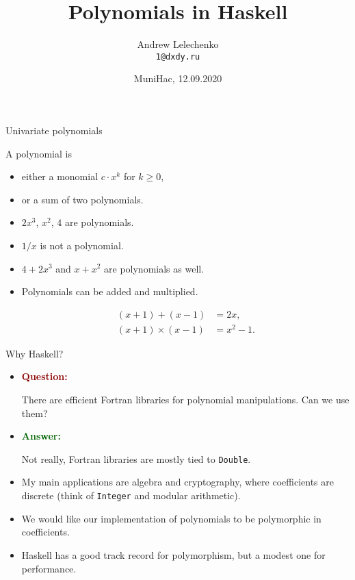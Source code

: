 \documentclass[handout]{beamer}
\title{Polynomials in Haskell}
\author[Andrew Lelechenko]{Andrew Lelechenko \\ \texttt{1@dxdy.ru}}
\institute[Barclays]{Barclays, London}
\date{MuniHac, 12.09.2020}
\def\ge{\geqslant}
\begin{document}
\begin{frame}
  \titlepage
\end{frame}

\begin{frame}{Univariate polynomials}
\begin{definition}
A polynomial is
\begin{itemize}
\item either a monomial $c\cdot x^k$ for $k \ge 0$,
\item or a sum of two polynomials.
\end{itemize}
\end{definition}

\pause

\begin{itemize}[<+->]
\item $2x^3$, $x^2$, $4$ are polynomials.
\item $1/x$ is not a polynomial.
\item $4+2x^3$ and $x+x^2$ are polynomials as well.
\item Polynomials can be added and multiplied.

\vspace{-1em}

\begin{align*}
(x + 1) + (x - 1) &= 2 x, \\
(x + 1) \times (x - 1) &= x^2 - 1.
\end{align*}

\end{itemize}

\end{frame}

\begin{frame}{Why Haskell?}
\begin{itemize}[<+->]
\item
\textcolor{darkred}{\bf Question:} \par
There are efficient Fortran libraries
for polynomial manipulations. Can we use them?
\item
\textcolor{darkgreen}{\bf Answer:} \par
Not really, Fortran libraries are mostly
tied to {\tt Double}.
\item My main applications are algebra and
cryptography, where coefficients are discrete
(think of {\tt Integer} and modular arithmetic).
\item We would like our implementation of polynomials
to be polymorphic in coefficients.
\item Haskell has a good track record for polymorphism,
but a modest one for performance.
\end{itemize}
\end{frame}
\end{document}
